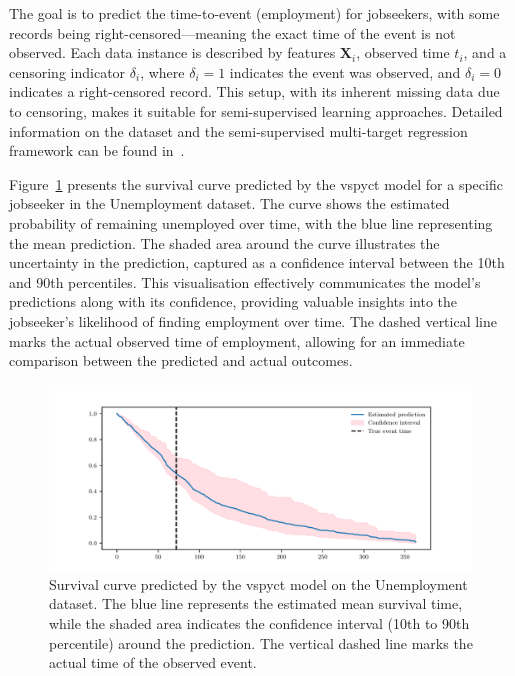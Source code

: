 \documentclass[3p,review,authoryear]{elsarticle}
\begin{document}
The goal is to predict the time-to-event (employment) for jobseekers, with some records being right-censored—meaning the exact time of the event is not observed.
Each data instance is described by features \(\mathbf{X}_i\), observed time \(t_i\), and a censoring indicator \(\delta_i\), where \(\delta_i = 1\) indicates the event was observed, and \(\delta_i = 0\) indicates a right-censored record.
This setup, with its inherent missing data due to censoring, makes it suitable for semi-supervised learning approaches.
Detailed information on the dataset and the semi-supervised multi-target regression framework can be found in~\cite{Andonovikj_2024}.

Figure~\ref{fig:pred_ci} presents the survival curve predicted by the \gls{vspyct} model for a specific jobseeker in the Unemployment dataset.
The curve shows the estimated probability of remaining unemployed over time, with the blue line representing the mean prediction.
The shaded area around the curve illustrates the uncertainty in the prediction, captured as a confidence interval between the 10th and 90th percentiles.
This visualisation effectively communicates the model's predictions along with its confidence, providing valuable insights into the jobseeker's likelihood of finding employment over time.
The dashed vertical line marks the actual observed time of employment, allowing for an immediate comparison between the predicted and actual outcomes.

\begin{figure}[h!]
    \centering
    \includegraphics[width=1.0\textwidth]{pred_with_ci.pdf}
    \caption{Survival curve predicted by the \gls{vspyct} model on the Unemployment dataset. The blue line represents the estimated mean survival time, while the shaded area indicates the confidence interval (10th to 90th percentile) around the prediction. The vertical dashed line marks the actual time of the observed event.}
    \label{fig:pred_ci}
\end{figure}
\end{document}
